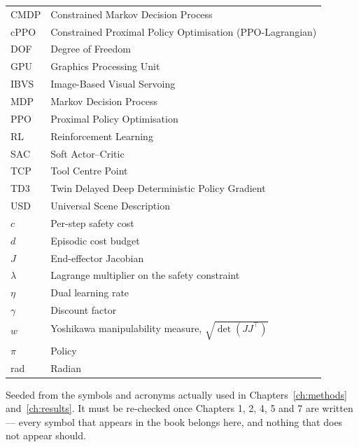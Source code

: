 
\begin{longtable}{@{}p{}p{}@{}}
CMDP        & Constrained Markov Decision Process \\
cPPO        & Constrained Proximal Policy Optimisation (PPO-Lagrangian) \\
DOF         & Degree of Freedom \\
GPU         & Graphics Processing Unit \\
IBVS        & Image-Based Visual Servoing \\
MDP         & Markov Decision Process \\
PPO         & Proximal Policy Optimisation \\
RL          & Reinforcement Learning \\
SAC         & Soft Actor--Critic \\
TCP         & Tool Centre Point \\
TD3         & Twin Delayed Deep Deterministic Policy Gradient \\
USD         & Universal Scene Description \\
$c$         & Per-step safety cost \\
$d$         & Episodic cost budget \\
$J$         & End-effector Jacobian \\
$\lambda$   & Lagrange multiplier on the safety constraint \\
$\eta$      & Dual learning rate \\
$\gamma$    & Discount factor \\
$w$         & Yoshikawa manipulability measure, $\sqrt{\det(JJ^{\top})}$ \\
$\pi$       & Policy \\
rad         & Radian \\
\end{longtable}

\begin{draftnote}
Seeded from the symbols and acronyms actually used in Chapters~\ref{ch:methods}
and~\ref{ch:results}. It must be re-checked once Chapters 1, 2, 4, 5 and 7 are written --- every
symbol that appears in the book belongs here, and nothing that does not appear should.
\end{draftnote}

\clearpage

